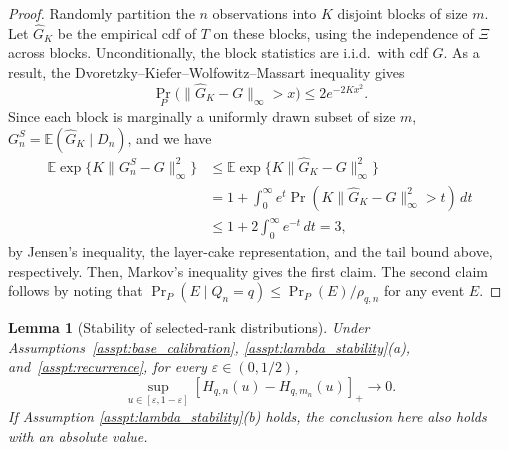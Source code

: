\documentclass[10pt]{article}
\newcommand{\E}{\mathbb{E}}
\newtheorem{lemma}{Lemma}
\begin{document}
\begin{proof}
Randomly partition the $n$ observations into $K$ disjoint blocks of size $m$. Let $\widehat G_K$ be the empirical cdf of $T$
on these blocks, using the independence of $\Xi$ across blocks. Unconditionally,
the block statistics are i.i.d.\ with cdf $G$. As a result, the
Dvoretzky--Kiefer--Wolfowitz--Massart inequality
\citep{dvoretzky1956asymptotic, massart1990tight} gives
\[
\Pr_P\bigl(\|\widehat G_K-G\|_\infty>x\bigr)
\le 2e^{-2Kx^2}.
\]
Since each block is marginally a uniformly drawn subset of size $m$,
$G_n^S=\E(\widehat G_K\mid D_n)$, and we have
\[
\begin{aligned}
\E\exp\{K\|G_n^S-G\|_\infty^2\}
&\le \E\exp\{K\|\widehat G_K-G\|_\infty^2\}\\
&=1+\int_0^\infty e^t
\Pr\!\left(K\|\widehat G_K-G\|_\infty^2>t\right)\,dt\\
&\le 1+2\int_0^\infty e^{-t}\,dt=3,
\end{aligned}
\]
by Jensen's inequality, the layer-cake representation, and the tail bound above, respectively. Then, Markov's inequality gives the first claim. The second claim follows by noting that
$\Pr_P(E\mid Q_n=q)\le \Pr_P(E)/\rho_{q,n}$ for any event $E$.
\end{proof}

\begin{lemma}[Stability of selected-rank distributions]
\label{lem:random_threshold_stability}
Under Assumptions~\ref{asspt:base_calibration},
\ref{asspt:lambda_stability}(a), and~\ref{asspt:recurrence}, for every
$\varepsilon\in(0,1/2)$,
\[
\sup_{u\in[\varepsilon,1-\varepsilon]}
[H_{q,n}(u)-H_{q,m_n}(u)]_+\longrightarrow0.
\]
If Assumption \ref{asspt:lambda_stability}(b) holds, the conclusion here also holds with an absolute value.
\end{lemma}
\end{document}
